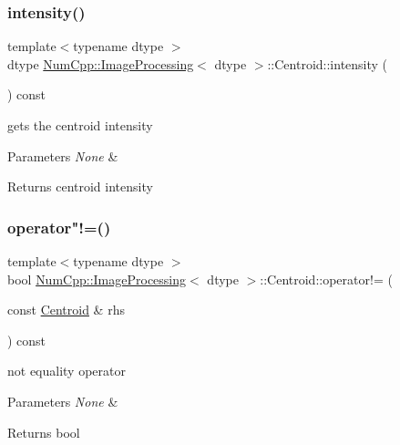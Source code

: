 \subsubsection{\texorpdfstring{intensity()}{intensity()}}
{\footnotesize\ttfamily template$<$typename dtype $>$ \\
dtype \mbox{\hyperlink{class_num_cpp_1_1_image_processing}{Num\+Cpp\+::\+Image\+Processing}}$<$ dtype $>$\+::Centroid\+::intensity (\begin{DoxyParamCaption}{ }\end{DoxyParamCaption}) const\hspace{0.3cm}{\ttfamily [inline]}}

gets the centroid intensity


\begin{DoxyParams}{Parameters}
{\em None} & \\
\hline
\end{DoxyParams}
\begin{DoxyReturn}{Returns}
centroid intensity 
\end{DoxyReturn}
\mbox{\label{class_num_cpp_1_1_image_processing_1_1_centroid_a8d4379234d83d9e2be391214d8e6d135}} 
\subsubsection{\texorpdfstring{operator"!=()}{operator!=()}}
{\footnotesize\ttfamily template$<$typename dtype $>$ \\
bool \mbox{\hyperlink{class_num_cpp_1_1_image_processing}{Num\+Cpp\+::\+Image\+Processing}}$<$ dtype $>$\+::Centroid\+::operator!= (\begin{DoxyParamCaption}\item[{const \mbox{\hyperlink{class_num_cpp_1_1_image_processing_1_1_centroid}{Centroid}} \&}]{rhs }\end{DoxyParamCaption}) const\hspace{0.3cm}{\ttfamily [inline]}}

not equality operator


\begin{DoxyParams}{Parameters}
{\em None} & \\
\hline
\end{DoxyParams}
\begin{DoxyReturn}{Returns}
bool 
\end{DoxyReturn}
\mbox{\label{class_num_cpp_1_1_image_processing_1_1_centroid_a9c5aed897ef47fa6a6933f843b9145ea}} 
